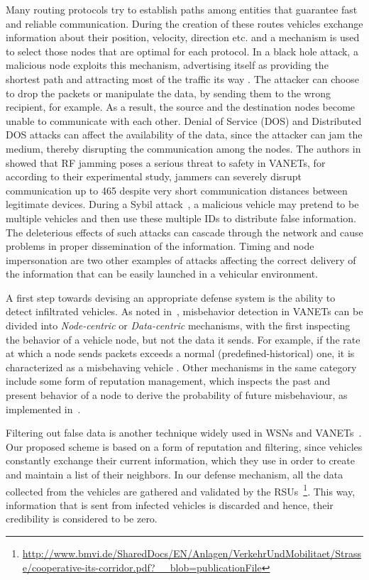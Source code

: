 \documentclass[conference]{IEEEtran}
\begin{document}
Many routing protocols try to establish paths among entities that guarantee fast and reliable communication. During the creation of these routes vehicles exchange information about their position, velocity, direction etc. and a mechanism is used to select those nodes that are optimal for each protocol. In a black hole attack, a malicious node exploits this mechanism, advertising itself as providing the shortest path and attracting most of the traffic its way \cite{bibhu2012performance}.  The attacker can choose to drop the packets or manipulate the data, by sending them to the wrong recipient, for example. As a result, the source and the destination nodes
become unable to communicate with each other. Denial of Service (DOS) and Distributed DOS attacks can affect the availability of the data, since the attacker can jam the medium, thereby disrupting the communication among the nodes. The authors in \cite{Punal_2015} showed that RF jamming poses a serious threat to safety in VANETs, for according to their experimental study, jammers can severely disrupt communication up to 465 despite very short communication distances between legitimate devices. 
During a Sybil attack~\cite{sumra2011classes}, a malicious vehicle may pretend to be multiple vehicles  and then use these multiple IDs to distribute
false information. The deleterious effects of such attacks can cascade through the network and cause problems in proper dissemination
of the information. Timing and node impersonation are two other examples of attacks affecting the correct delivery of the information that can be easily launched in a vehicular environment.




A first step towards devising an appropriate defense system is the ability to detect infiltrated vehicles. As noted in~\cite{khan2015detailed}, misbehavior detection in VANETs can be divided into {\it Node-centric} or {\it  Data-centric} mechanisms, with the first inspecting the behavior of a vehicle node, but not the data it sends. For example, 
if the rate at which a node sends packets exceeds a normal (predefined-historical) one, it is characterized as a misbehaving vehicle \cite{maglaras2015}. Other mechanisms in the same category include 
some form of reputation management, which inspects the past and present behavior of a node to derive the probability of future misbehaviour, as implemented in~\cite{kim2012misbehavior}. 

Filtering out false data is another technique widely used in WSNs and VANETs~\cite{cao2008proof}. 
Our proposed scheme is based on a form of reputation and filtering, since vehicles constantly exchange their current information, 
which they use in order to create and maintain a list of their neighbors. In our defense mechanism, all the data collected from the vehicles are gathered and validated by the RSUs~\footnote{\url{http://www.bmvi.de/SharedDocs/EN/Anlagen/VerkehrUndMobilitaet/Strasse/cooperative-its-corridor.pdf?__blob=publicationFile}}.
This way, information that is sent from infected vehicles is discarded and hence, their credibility is considered to be zero.
\end{document}

